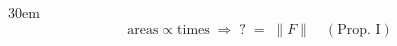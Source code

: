\documentclass[border=4pt]{standalone}
\begin{document}
\begin{varwidth}{30em}
\large
\[ \text{areas} \propto \text{times} \;\Rightarrow\; ?\;=\;\lVert F\rVert \quad (\text{Prop. I}) \]

\end{varwidth}
\end{document}
